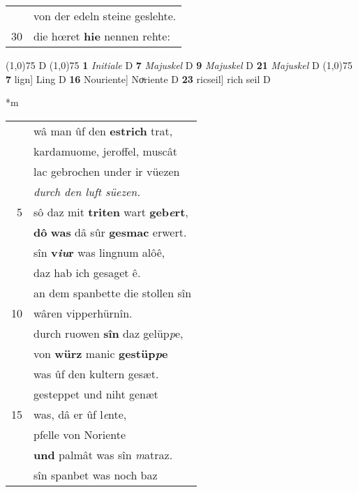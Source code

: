 \documentclass[8pt,a4paper,notitlepage]{article}
\begin{document}
\begin{table}[ht]
\begin{minipage}[t]{0.5\linewidth}
\begin{tabular}{rl}
 & von der edeln steine geslehte.\\ 
30 & die hœret \textbf{hie} nennen rehte:\\ 
\end{tabular}
\scriptsize
\line(1,0){75} \newline
D \newline
\line(1,0){75} \newline
\textbf{1} \textit{Initiale} D  \textbf{7} \textit{Majuskel} D  \textbf{9} \textit{Majuskel} D  \textbf{21} \textit{Majuskel} D  \newline
\line(1,0){75} \newline
\textbf{7} lign] Ling D \textbf{16} Nouriente] Noͮriente D \textbf{23} ricseil] rich seil D \newline
\end{minipage}
\hspace{0.5cm}
\begin{minipage}[t]{0.5\linewidth}
\small
\begin{center}*m
\end{center}
\begin{tabular}{rl}
 & wâ man ûf den \textbf{estrich} trat,\\ 
 & kardamuome, jeroffel, muscât\\ 
 & lac gebrochen under ir vüezen\\ 
 & \textit{durch den luft süezen.}\\ 
5 & sô daz mit \textbf{triten} wart \textbf{geb\textit{e}rt},\\ 
 & \textbf{dô} \textbf{was} dâ sûr \textbf{gesmac} erwert.\\ 
 & sîn \textbf{v\textit{iu}r} was lingnum alôê,\\ 
 & daz hab ich gesaget ê.\\ 
 & an dem spanbette die stollen sîn\\ 
10 & wâren vipperhürnîn.\\ 
 & durch ruowen \textbf{sîn} daz gelüp\textit{p}e,\\ 
 & von \textbf{würz} manic \textbf{gestüp\textit{p}e}\\ 
 & was ûf den kultern gesæt.\\ 
 & gesteppet und niht genæt\\ 
15 & was, dâ er ûf l\textit{e}nte,\\ 
 & pfelle von Noriente\\ 
 & \textbf{und} palmât was sîn \textit{m}atraz.\\ 
 & sîn spanbet was noch baz\\ 

\end{tabular}
\end{minipage}
\end{table}
\end{document}
